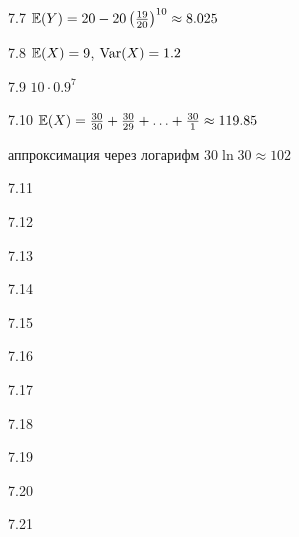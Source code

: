 \protect \hypertarget {soln:7.7}{}
\begin{solution}{{7.7}}
$\mathbb{E}(Y)=20-20 \left( \frac{19}{20} \right)^{10}\approx 8.025$
\end{solution}
\protect \hypertarget {soln:7.8}{}
\begin{solution}{{7.8}}
$\mathbb{E}(X)=9$, $\operatorname{Var}(X)=1.2$
\end{solution}
\protect \hypertarget {soln:7.9}{}
\begin{solution}{{7.9}}
  $10 \cdot 0.9^7$
\end{solution}
\protect \hypertarget {soln:7.10}{}
\begin{solution}{{7.10}}
  $\mathbb{E}(X)=\frac{30}{30} + \frac{30}{29} + \ldots + \frac{30}{1}\approx 119.85$

  аппроксимация через логарифм $30 \ln 30 \approx 102$
\end{solution}
\protect \hypertarget {soln:7.11}{}
\begin{solution}{{7.11}}
\end{solution}
\protect \hypertarget {soln:7.12}{}
\begin{solution}{{7.12}}
\end{solution}
\protect \hypertarget {soln:7.13}{}
\begin{solution}{{7.13}}
\end{solution}
\protect \hypertarget {soln:7.14}{}
\begin{solution}{{7.14}}
\end{solution}
\protect \hypertarget {soln:7.15}{}
\begin{solution}{{7.15}}
\end{solution}
\protect \hypertarget {soln:7.16}{}
\begin{solution}{{7.16}}
\end{solution}
\protect \hypertarget {soln:7.17}{}
\begin{solution}{{7.17}}
\end{solution}
\protect \hypertarget {soln:7.18}{}
\begin{solution}{{7.18}}
\end{solution}
\protect \hypertarget {soln:7.19}{}
\begin{solution}{{7.19}}
\end{solution}
\protect \hypertarget {soln:7.20}{}
\begin{solution}{{7.20}}
\end{solution}
\protect \hypertarget {soln:7.21}{}
\begin{solution}{{7.21}}
\end{solution}
